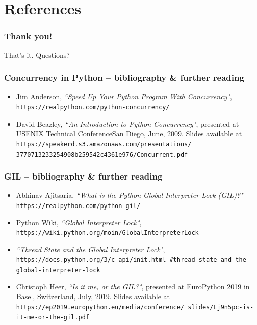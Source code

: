 \documentclass{beamer}
\begin{document}
    \section{References}

    \begin{frame}
        \frametitle{Thank you!}
        \centering
        That's it. Questions?
    \end{frame}

    \begin{frame}
        \frametitle{Concurrency in Python -- bibliography \& further reading}

        \begin{itemize}
            \item<1-> Jim Anderson, \emph{``Speed Up Your Python Program With Concurrency"},
            \texttt{https://realpython.com/python-concurrency/}
            \item<1-> David Beazley, \emph{``An Introduction to Python Concurrency"},
                presented at USENIX Technical ConferenceSan Diego, June, 2009.
                Slides available at \texttt{https://speakerd.s3.amazonaws.com/presentations/
            3770713233254908b259542c4361e976/Concurrent.pdf}
        \end{itemize}
    \end{frame}

    \begin{frame}
        \frametitle{GIL -- bibliography \& further reading}
        \begin{itemize}
            \item<1-> Abhinav Ajitsaria, \emph{``What is the Python Global Interpreter Lock (GIL)?"}
            \texttt{https://realpython.com/python-gil/}
            \item<1-> Python Wiki, \emph{``Global Interpreter Lock"},
            \texttt{https://wiki.python.org/moin/GlobalInterpreterLock}
            \item<1-> \emph{``Thread State and the Global Interpreter Lock"},
            \texttt{https://docs.python.org/3/c-api/init.html
            \#thread-state-and-the-global-interpreter-lock}
            \item<1-> Christoph Heer, \emph{``Is it me, or the GIL?"}, presented at
            EuroPython 2019 in Basel, Switzerland, July, 2019.
            Slides available at \texttt{https://ep2019.europython.eu/media/conference/
            slides/Lj9n5pc-is-it-me-or-the-gil.pdf}
        \end{itemize}

    \end{frame}

%    
%    
%
\end{document}
